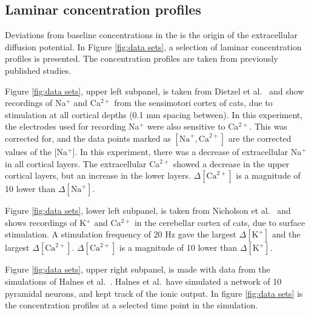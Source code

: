 \documentclass{uiophd}
\begin{document}
\subsection{Laminar concentration profiles}

Deviations from baseline concentrations in the is the origin of the extracellular diffusion potential. In Figure \ref{fig:data sets}, a selection of laminar concentration profiles is presented. The concentration profiles are taken from previously published studies. 

Figure \ref{fig:data sets}, upper left subpanel, is taken from Dietzel et al.\ \cite{Dietzel1982}  and show recordings of Na$^+$ and Ca$^{2+}$ from the sensimotori cortex of cats, due to stimulation at all cortical depths (0.1 mm spacing between).  In this experiment, the electrodes used for recording Na$^+$ were also sensitive to Ca$^{2+}$. This was corrected for, and the data points marked as $[\text{Na}^+, \text{Ca}^{2+}]$ are the corrected values of the [Na$^+$]. In this experiment, there was a decrease of extracellular Na$^+$ in all cortical layers. The extracellular Ca$^{2+}$ showed a decrease in the upper cortical layers, but an increase in the lower layers. $\Delta [\text{Ca}^{2+}]$ is  a magnitude of 10 lower than  $\Delta [\text{Na}^+]$.

Figure \ref{fig:data sets}, lower left subpanel, is taken from Nicholson et al.\ \cite{Nicholson1987} and shows recordings of K$^+$ and Ca$^{2+}$ in the cerebellar cortex of cats, due to surface stimulation. A stimulation frequency of 20 Hz gave the largest $\Delta [\text{K}^+]$ and the largest $\Delta [\text{Ca}^{2+}]$.   $\Delta [\text{Ca}^{2+}]$ is  a magnitude of 10 lower than  $\Delta [\text{K}^+]$.


Figure \ref{fig:data sets}, upper right subpanel, is made with data from the simulations of Halnes et al.\ \cite{Halnes2016}. Halnes et al.\ have simulated a network of 10 pyramidal neurons, and kept track of the ionic output. In figure \ref{fig:data sets} is the concentration profiles at a selected time point in the simulation.
\end{document}
